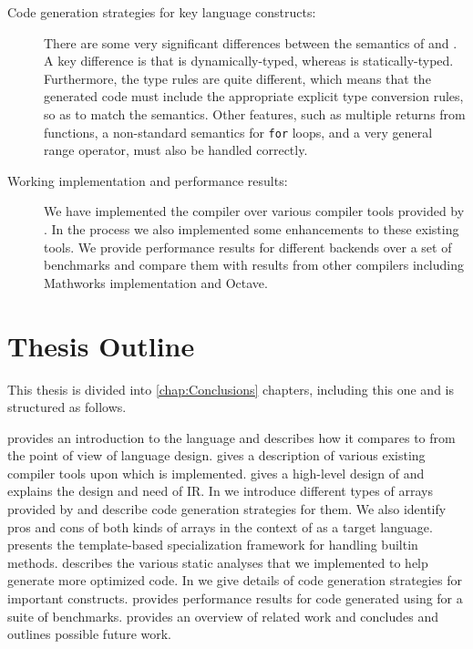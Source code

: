 \begin{description}
\item[Code generation strategies for key language constructs:]  There
are some very significant differences between the semantics of \matlab
and \xten.  A key difference is that \matlab is dynamically-typed,
whereas \xten is statically-typed.   Furthermore, the type rules are
quite different, which means that the generated \xten code must include
the appropriate explicit type conversion rules, so as to match the
\matlab semantics.   Other \matlab features, such as multiple returns
from functions, a non-standard semantics for \texttt{for} loops, and a
very general range operator, must also be handled correctly.

\item[Working implementation and performance results:] We have implemented the 
\mixten compiler over various \matlab compiler tools provided by \mclab. In the
process we also implemented some enhancements to these existing tools.
We provide performance results for different \xten backends over a set 
of benchmarks and compare them with results from other \matlab compilers
including Mathworks \matlab implementation and Octave.

\end{description}

\section{Thesis Outline}

This thesis is divided into \ref{chap:Conclusions} chapters, including this one
and is structured as follows. 

 provides an introduction to the \xten language and describes
how it compares to \matlab from the point of view of language design.
 gives a description of various existing \matlab
compiler tools upon which \mixten is implemented. 
 gives a high-level design of \mixten and explains the
design and need of \mixten IR.
In  we introduce different types of arrays provided by
\xten and describe code generation strategies for them. We also identify pros
and cons of both kinds of arrays in the context of \xten as a target language.
 presents the template-based specialization framework for
handling \matlab builtin methods.
 describes the various static analyses that we
implemented to help generate more optimized code.
In  we give details of code generation strategies for
important \matlab constructs.
 provides performance results for code generated using
\mixten for a suite of benchmarks.
 provides an overview of related work and
 concludes and outlines possible future work.


